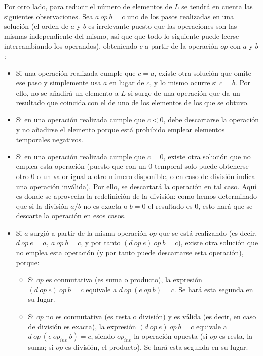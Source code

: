 Por otro lado, para reducir el número de elementos de $L$ se tendrá en cuenta
las siguientes observaciones. Sea $a\ op\ b = c$ uno de los pasos realizadas en
una solución (el orden de $a$ y $b$ es irrelevante puesto que las operaciones
son las mismas independiente del mismo, así que que todo lo siguiente puede
leerse intercambiando los operandos), obteniendo $c$ a partir de la operación
$op$ con $a$ y $b$:

\begin{itemize}
	\item Si una operación realizada cumple que $c=a$, existe otra solución que
	omite ese paso y simplemente usa $a$ en lugar de $c$, y lo mismo ocurre si
	$c=b$. Por ello, no se añadirá un elemento a $L$ si surge de una operación
	que da un resultado que coincida con el de uno de los elementos de los que se
	obtuvo.
	\item Si en una operación realizada cumple que $c < 0$, debe descartarse la
	operación y no añadirse el elemento porque está prohibido emplear elementos
	temporales negativos.
	\item Si en una operación realizada cumple que $c = 0$, existe otra solución
	que no emplea esta operación (puesto que con un $0$ temporal solo puede
	obtenerse otro $0$ o un valor igual a otro número disponible, o en caso de
	división indica una operación inválida). Por ello, se descartará la operación
	en tal caso. Aquí es donde se aprovecha la redefinición de la división: como
	hemos determinado que si la división $a/b$ no es exacta o $b=0$ el resultado
	es $0$, esto hará que se descarte la operación en esos casos.
	\item Si $a$ surgió a partir de la misma operación $op$ que se está realizando
	(es decir, $d\ op\ e = a,\ a\ op\ b = c$, y por tanto $(d\ op\ e)\ op\ b = c$),
	existe otra solución que no emplea esta operación (y por tanto puede
	descartarse esta operación), porque:
	\begin{itemize}
		\item Si $op$ es conmutativa (es suma o producto), la expresión
		$(d\ op\ e)\ op\ b = c$ equivale a $d\ op\ (e\ op\ b) = c$. Se hará esta
		segunda en su lugar.
		\item Si $op$ no es conmutativa (es resta o división) y es válida (es decir,
		en caso de división es exacta), la expresión $(d\ op\ e)\ op\ b = c$
		equivale a $d\ op\ (e\ op_{inv}\ b) = c$, siendo $op_{inv}$ la operación
		opuesta (si $op$ es resta, la suma; si $op$ es división, el producto).
		Se hará esta segunda en su lugar.
	\end{itemize}

\end{itemize}
